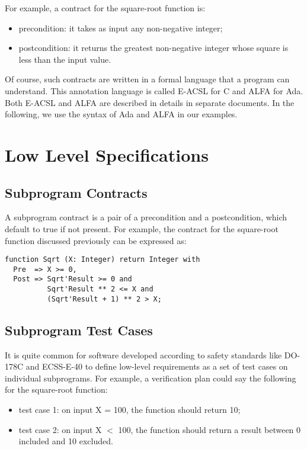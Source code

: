 \documentclass{article}
\begin{document}
For example, a contract for the square-root function is:
\begin{itemize}
\item precondition: it takes as input any non-negative integer;
\item postcondition: it returns the greatest non-negative integer whose square
  is less than the input value.
\end{itemize}

Of course, such contracts are written in a formal language that a program can
understand. This annotation language is called E-ACSL for C and ALFA for Ada.
Both E-ACSL and ALFA are described in details in separate documents. In the
following, we use the syntax of Ada and ALFA in our examples.

\section{Low Level Specifications}

\subsection{Subprogram Contracts}

A subprogram contract is a pair of a precondition and a postcondition, which
default to true if not present. For example, the contract for the square-root
function discussed previously can be expressed as:

\begin{verbatim}
function Sqrt (X: Integer) return Integer with
  Pre  => X >= 0,
  Post => Sqrt'Result >= 0 and 
          Sqrt'Result ** 2 <= X and
          (Sqrt'Result + 1) ** 2 > X;
\end{verbatim}

\subsection{Subprogram Test Cases}

It is quite common for software developed according to safety standards like
DO-178C and ECSS-E-40 to define low-level requirements as a set of test cases
on individual subprograms. For example, a verification plan could say the
following for the square-root function:
\begin{itemize}
\item test case 1: on input X = 100, the function should return 10;
\item test case 2: on input X $<$ 100, the function should return a result between 0 included and 10 excluded.
\end{itemize}
\end{document}
